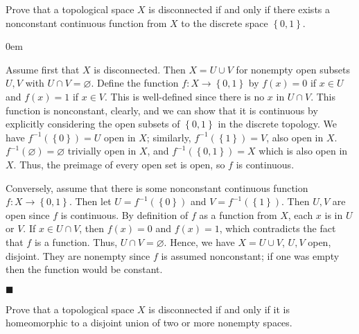 \documentclass[12pt]{article}
\renewcommand{\qed}{\hfill$\blacksquare$}
\renewenvironment{proof}{\begin{addmargin}[1em]{0em}\begin{newproof}}{\end{newproof}\end{addmargin}\qed}
\newenvironment{exercise}[2][Exercise]{\begin{trivlist}
\item[\hskip \labelsep {\bfseries #1}\hskip \labelsep {\bfseries #2.}]}{\end{trivlist}}
\begin{document}
\begin{exercise}{4.4}
Prove that a topological space $X$ is disconnected if and only if there exists a nonconstant continuous function from $X$ to the discrete space $\left\{0,1\right\}$.
\end{exercise}
\begin{proof}
Assume first that $X$ is disconnected. Then $X=U\cup V$ for nonempty open subsets $U,V$ with $U\cap V=\varnothing$. Define the function $f:X\rightarrow \left\{0,1\right\}$ by $f\left(x\right) = 0 $ if $x\in U$ and $f\left(x\right)=1$ if $x\in V$. This is well-defined since there is no $x$ in $U\cap V$. This function is nonconstant, clearly, and we can show that it is continuous by explicitly considering the open subsets of $\left\{0,1\right\}$ in the discrete topology. We have $f^{-1}\left(\left\{0\right\}\right) = U$ open in $X$; similarly, $f^{-1}\left(\left\{1\right\}\right) = V$, also open in $X$. $f^{-1}\left(\varnothing\right)=\varnothing$ trivially open in $X$, and $f^{-1}\left(\left\{0,1\right\}\right) = X$ which is also open in $X$. Thus, the preimage of every open set is open, so $f$ is continuous.

Conversely, assume that there is some nonconstant continuous function $f:X\rightarrow \left\{0,1\right\}$. Then let $U=f^{-1}\left(\left\{0\right\}\right)$ and $V=f^{-1}\left(\left\{1\right\}\right)$. Then $U,V$ are open since $f$ is continuous. By definition of $f$ as a function from $X$, each $x$ is in $U$ or $V$. If $x \in U\cap V$, then $f\left(x\right) = 0$ and $f\left(x\right)=1$, which contradicts the fact that $f$ is a function. Thus, $U\cap V=\varnothing$. Hence, we have $X=U\cup V$, $U,V$ open, disjoint. They are nonempty since $f$ is assumed nonconstant; if one was empty then the function would be constant.
\end{proof}




\begin{exercise}{4.5}
Prove that a topological space $X$ is disconnected if and only if it is homeomorphic to a disjoint union of two or more nonempty spaces.
\end{exercise}
\end{document}
